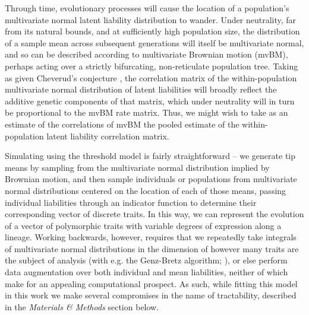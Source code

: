 Through time, evolutionary processes will cause the location of a population's multivariate normal latent liability distribution to wander. Under neutrality, far from its natural bounds, and at sufficiently high population size, the distribution of a sample mean across subsequent generations will itself be multivariate normal, and so can be described according to multivariate Brownian motion (mvBM), perhaps acting over a strictly bifurcating, non-reticulate population tree. Taking as given Cheverud's conjecture \citep{cheverudDevelopmentalIntegrationEvolution1996, sodiniComparisonGenotypicPhenotypic2018}, the correlation matrix of the within-population multivariate normal distribution of latent liabilities will broadly reflect the additive genetic components of that matrix, which under neutrality will in turn be proportional to the mvBM rate matrix. Thus, we might wish to take as an estimate of the correlations of mvBM the pooled estimate of the within-population latent liability correlation matrix.

Simulating using the threshold model is fairly straightforward – we generate tip means by sampling from the multivariate normal distribution implied by Brownian motion, and then sample individuals or populations from multivariate normal distributions centered on the location of each of those means, passing individual liabilities through an indicator function to determine their corresponding vector of discrete traits. In this way, we can represent the evolution of a vector of polymorphic traits with variable degrees of expression along a lineage. Working backwards, however, requires that we repeatedly take integrals of multivariate normal distributions in the dimension of however many traits are the subject of analysis (with e.g. the Genz-Bretz algorithm; \citealt{genzComparisonMethodsComputation2002}), or else perform data augmentation over both individual and mean liabilities, neither of which make for an appealing computational prospect. As such, while fitting this model in this work we make several compromises in the name of tractability, described in the \textit{Materials \& Methods} section below.  


